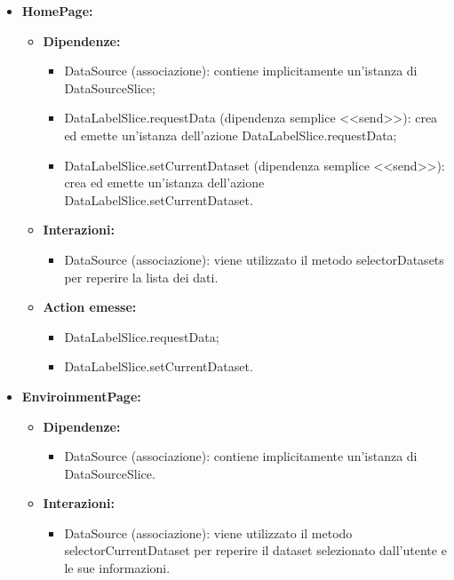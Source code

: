 \begin{itemize}
    \item \textbf{HomePage:}
    \begin{itemize}
        \item \textbf{Dipendenze:}
        \begin{itemize}
            \item DataSource (associazione): contiene implicitamente un'istanza di DataSourceSlice;
            \item DataLabelSlice.requestData (dipendenza semplice <<send>>): crea ed emette un’istanza dell’azione DataLabelSlice.requestData;
            \item DataLabelSlice.setCurrentDataset (dipendenza semplice <<send>>): crea ed emette un’istanza dell’azione DataLabelSlice.setCurrentDataset.
        \end{itemize} 
        \item \textbf{Interazioni:}
        \begin{itemize}
            \item DataSource (associazione): viene utilizzato il metodo selectorDatasets per reperire la lista dei dati.
        \end{itemize} 
        \item \textbf{Action emesse:}
        \begin{itemize}
            \item DataLabelSlice.requestData;
            \item DataLabelSlice.setCurrentDataset.
        \end{itemize} 
    \end{itemize}

    \item \textbf{EnviroinmentPage:}
    \begin{itemize}
        \item \textbf{Dipendenze:}
        \begin{itemize}
            \item DataSource (associazione): contiene implicitamente un'istanza di DataSourceSlice.
        \end{itemize} 
        \item \textbf{Interazioni:}
        \begin{itemize}
            \item DataSource (associazione): viene utilizzato il metodo selectorCurrentDataset per reperire il dataset selezionato dall'utente e le sue informazioni.
        \end{itemize}  
    \end{itemize}
\end{itemize}

